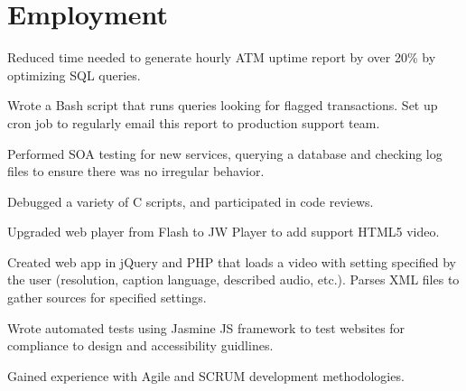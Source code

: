 \documentclass[]{deedy-resume-openfont}
\begin{document}
\begin{minipage}[t]{0.66\textwidth} 


\section{Employment}

\vspace{\topsep} %
\begin{tightemize}
\item Reduced time needed to generate hourly ATM uptime report by over 20\% by optimizing SQL queries.
\item Wrote a Bash script that runs queries looking for flagged transactions. Set up cron job to regularly email this report to production support team.
\item Performed SOA testing for new services, querying a database and checking log files to ensure there was no irregular behavior.
\item Debugged a variety of C scripts, and participated in code reviews.
\end{tightemize}
\sectionsep

\begin{tightemize}
\item Upgraded web player from Flash to JW Player to add support HTML5 video.
\item Created web app in jQuery and PHP that loads a video with setting specified by the user (resolution, caption language, described audio, etc.). Parses XML files to gather sources for specified settings.
\item Wrote automated tests using Jasmine JS framework to test websites for compliance to design and accessibility guidlines.
\item Gained experience with Agile and SCRUM development methodologies.
\end{tightemize}
\sectionsep



\end{minipage}
\end{document}
